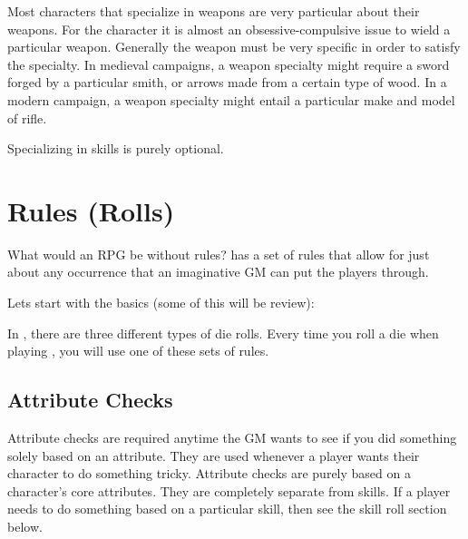 \documentclass[twoside]{book}
\begin{document}
    {  
     Most characters that specialize in weapons are
                 very particular about their weapons. For the character
                 it is almost an obsessive-compulsive issue to wield a
                 particular weapon. Generally the weapon must be very
                 specific in order to satisfy the specialty. In medieval
                 campaigns, a weapon specialty might require a sword
                 forged by a particular smith, or arrows made from a
                 certain type of wood. In a modern campaign, a weapon
                 specialty might entail a particular make and model of
                 rifle. 
    }
  
    {  
     Specializing in skills is purely optional. 
    }
  
    

\section{Rules (Rolls)}
    
    {  
     What would an RPG be without rules? \APATHY{}  has a
            set of rules that allow for just about any occurrence that an
            imaginative GM can put the players through.
          
    }
  
    {  
     Lets start with the basics (some of this will be
             review): 
    }
  
    {  
     In \APATHY{}, there are three different types of die
            rolls. Every time you roll a die when playing \APATHY{},
            you will use one of these sets of rules.
          
    }
  
    

\subsection{Attribute Checks}
    
    {  
     Attribute checks are required anytime the GM wants
               to see if you did something solely based on an attribute.
               They are used whenever a player wants their character to
               do something tricky. Attribute checks are purely based on
               a character's core attributes. They are completely
               separate from skills. If a player needs to do something
               based on a particular skill, then see the skill roll
               section below. 
    }
  
\end{document}
